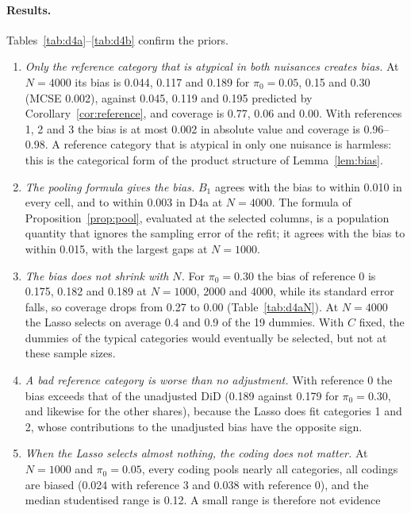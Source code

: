 \documentclass[11pt]{article}
\newenvironment{ins}{\begin{leftbar}}{\end{leftbar}}
\theoremstyle{plain}
\theoremstyle{remark}
\begin{document}
\begin{ins}

\paragraph{Results.} Tables~\ref{tab:d4a}--\ref{tab:d4b} confirm the priors.
\begin{enumerate}
\item \emph{Only the reference category that is atypical in both nuisances
  creates bias.} At $N=4000$ its bias is 0.044, 0.117 and 0.189 for
  $\pi_0=0.05$, 0.15 and 0.30 (MCSE 0.002), against 0.045, 0.119 and 0.195
  predicted by Corollary~\ref{cor:reference}, and coverage is 0.77, 0.06 and
  0.00. With references 1, 2 and 3 the bias is at most 0.002 in absolute value
  and coverage is 0.96--0.98. A reference category that is atypical in only one
  nuisance is harmless: this is the categorical form of the product structure
  of Lemma~\ref{lem:bias}.
\item \emph{The pooling formula gives the bias.} $B_1$ agrees with the bias to
  within 0.010 in every cell, and to within 0.003 in D4a at $N=4000$. The formula
  of Proposition~\ref{prop:pool}, evaluated at the selected columns, is a
  population quantity that ignores the sampling error of the refit; it agrees
  with the bias to within 0.015, with the largest gaps at $N=1000$.
\item \emph{The bias does not shrink with $N$.} For $\pi_0=0.30$ the bias of
  reference 0 is 0.175, 0.182 and 0.189 at $N=1000$, 2000 and 4000, while its
  standard error falls, so coverage drops from 0.27 to 0.00
  (Table~\ref{tab:d4aN}). At $N=4000$ the Lasso selects on average 0.4 and 0.9
  of the 19 dummies. With $C$ fixed, the dummies of the typical categories
  would eventually be selected, but not at these sample sizes.
\item \emph{A bad reference category is worse than no adjustment.} With
  reference 0 the bias exceeds that of the unadjusted DiD (0.189 against 0.179
  for $\pi_0=0.30$, and likewise for the other shares), because the Lasso does
  fit categories 1 and 2, whose contributions to the unadjusted bias have the
  opposite sign.
\item \emph{When the Lasso selects almost nothing, the coding does not matter.}
  At $N=1000$ and $\pi_0=0.05$, every coding pools nearly all categories, all
  codings are biased (0.024 with reference 3 and 0.038 with reference 0), and
  the median studentised range is 0.12. A small range is therefore not evidence

\end{enumerate}
\end{ins}
\end{document}
